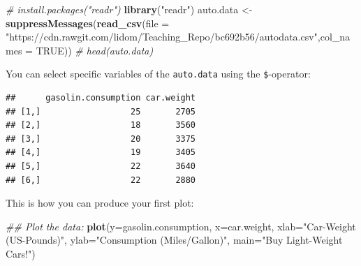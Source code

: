 \documentclass[]{book}
\newenvironment{Shaded}{\begin{snugshade}}{\end{snugshade}}
\newcommand{\CommentTok}[1]{\textcolor[rgb]{0.56,0.35,0.01}{\textit{#1}}}
\newcommand{\DataTypeTok}[1]{\textcolor[rgb]{0.13,0.29,0.53}{#1}}
\newcommand{\KeywordTok}[1]{\textcolor[rgb]{0.13,0.29,0.53}{\textbf{#1}}}
\newcommand{\NormalTok}[1]{#1}
\newcommand{\OperatorTok}[1]{\textcolor[rgb]{0.81,0.36,0.00}{\textbf{#1}}}
\newcommand{\OtherTok}[1]{\textcolor[rgb]{0.56,0.35,0.01}{#1}}
\newcommand{\StringTok}[1]{\textcolor[rgb]{0.31,0.60,0.02}{#1}}
\theoremstyle{definition}
\theoremstyle{definition}
\theoremstyle{definition}
\theoremstyle{remark}
\begin{document}
\begin{Shaded}
\begin{Highlighting}[]
\CommentTok{# install.packages("readr")}
\KeywordTok{library}\NormalTok{(}\StringTok{"readr"}\NormalTok{)}
\NormalTok{auto.data <-}\StringTok{ }\KeywordTok{suppressMessages}\NormalTok{(}\KeywordTok{read_csv}\NormalTok{(}\DataTypeTok{file =} \StringTok{"https://cdn.rawgit.com/lidom/Teaching_Repo/bc692b56/autodata.csv"}\NormalTok{,}\DataTypeTok{col_names =} \OtherTok{TRUE}\NormalTok{))}
\CommentTok{# head(auto.data)}
\end{Highlighting}
\end{Shaded}

You can select specific variables of the \texttt{auto.data} using the \texttt{\$}-operator:

\begin{Shaded}
\end{Shaded}

\begin{verbatim}
##      gasolin.consumption car.weight
## [1,]                  25       2705
## [2,]                  18       3560
## [3,]                  20       3375
## [4,]                  19       3405
## [5,]                  22       3640
## [6,]                  22       2880
\end{verbatim}

This is how you can produce your first plot:

\begin{Shaded}
\begin{Highlighting}[]
\CommentTok{## Plot the data:}
\KeywordTok{plot}\NormalTok{(}\DataTypeTok{y=}\NormalTok{gasolin.consumption, }\DataTypeTok{x=}\NormalTok{car.weight, }
     \DataTypeTok{xlab=}\StringTok{"Car-Weight (US-Pounds)"}\NormalTok{, }
     \DataTypeTok{ylab=}\StringTok{"Consumption (Miles/Gallon)"}\NormalTok{, }
     \DataTypeTok{main=}\StringTok{"Buy Light-Weight Cars!"}\NormalTok{)}
\end{Highlighting}
\end{Shaded}
\end{document}
